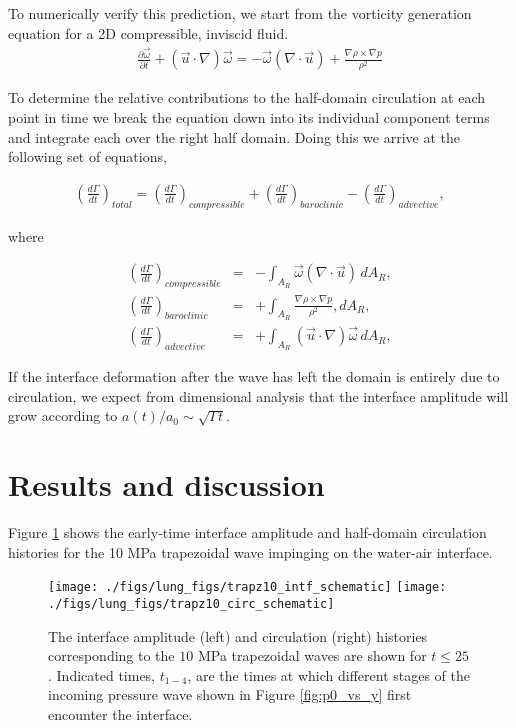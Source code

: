 To numerically verify this prediction, we start from the vorticity generation equation for a 2D compressible, inviscid fluid.
\begin{align} \label{eq:vorticity_euler}
  \frac{\partial \vec{\omega}}{\partial t}+\left(\vec{u}\cdot\nabla\right)\vec{\omega} =%
  - \vec{\omega}\left(\nabla\cdot\vec{u}\right) + \frac{\nabla\rho\times\nabla p}{\rho^2}%
\end{align}

To determine the relative contributions to the half-domain circulation
at each point in time we break the equation down into its individual
component terms and integrate each over the right half domain. Doing
this we arrive at the following set of equations,

\begin{align}
  \left(\frac{d\Gamma}{dt}\right)_{total} = \left(\frac{d\Gamma}{dt}\right)_{compressible} + \left(\frac{d\Gamma}{dt}\right)_{baroclinic} - \left(\frac{d\Gamma}{dt}\right)_{advective},
\end{align}

where 

\begin{align}
  &\left(\frac{d\Gamma}{dt}\right)_{compressible} &=& -\int_{A_R} \vec{\omega}\left(\nabla\cdot\vec{u}\right) \, dA_R,&\\
  &\left(\frac{d\Gamma}{dt}\right)_{baroclinic} &=& +\int_{A_R} \frac{\nabla\rho\times\nabla p}{\rho^2}, dA_R,&\\
  &\left(\frac{d\Gamma}{dt}\right)_{advective} &=& +\int_{A_R} \left(\vec{u}\cdot\nabla\right)\vec{\omega} \, dA_R,&
\end{align}

If the interface deformation after the wave has left the domain is
entirely due to circulation, we expect from dimensional analysis that
the interface amplitude will grow according to
$a(t)/a_0 \sim \sqrt{\Gamma t}$.


\section{Results and discussion} \label{sec:usbe_lung_results} Figure
\ref{fig:trapz10_circ_interface} shows the early-time interface
amplitude and half-domain circulation histories for the 10 MPa
trapezoidal wave impinging on the water-air interface.

\begin{figure}[h] 
  \centering
  \texttt{[image: ./figs/lung\_figs/trapz10\_intf\_schematic]}
  \texttt{[image: ./figs/lung\_figs/trapz10\_circ\_schematic]}
  \caption{The interface amplitude (left) and circulation (right)
    histories corresponding to the $10$ MPa trapezoidal waves are shown
    for $t\leq25$. Indicated times, $t_{1-4}$, are the times at which
    different stages of the incoming pressure wave shown in Figure
    \ref{fig:p0_vs_y} first encounter the interface.}
  \label{fig:trapz10_circ_interface}
\end{figure}

